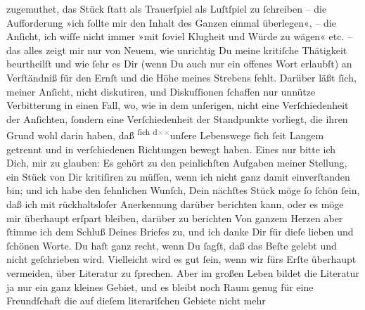 \begin{ledgroupsized}[t]{13cm}
               zugemuthet, das Stück ſtatt
               als Trauerſpiel als Luſtſpiel zu ſchreiben – die Aufforderung »ich ſollte  mir den Inhalt des Ganzen einmal überlegen«, – die
               Anſicht, ich wiſſe nicht immer »mit ſoviel Klugheit und Würde zu wägen« etc. – das
               alles zeigt mir nur von Neuem, wie unrichtig Du \strikeout{\textcolor{gray}{me}} meine kritiſche Thätigkeit beurtheilſt und \strikeout{\textcolor{gray}{mit}} wie ſehr es Dir (wenn Du auch nur ein offenes Wort erlaubſt) an Verſtändniß
               für den Ernſt und die Höhe meines Strebens fehlt. Darüber läßt ſich, meiner Anſicht,
               nicht diskutiren, und Diskuſſionen ſchaffen nur 
               unnütze Verbitterung in einen Fall, wo, wie in dem {\pb}unſerigen, nicht eine Verſchiedenheit der Anſichten, ſondern eine Verſchiedenheit
               der Standpunkte vorliegt, die ihren Grund wohl darin haben, daß \substVorne{}\textsuperscript{ſich d\textcolor{gray}{×}\-\textcolor{gray}{×}}{\allowbreak}\substDazwischen{}unſere\substHinten{} Lebenswege ſich ſeit Langem getrennt und in verſchiedenen Richtungen bewegt
               haben.\pend
           \pstart
           Eines nur bitte ich Dich, mir zu glauben: Es gehört zu den peinlichſten Aufgaben
               meiner Stellung, ein Stück von Dir \strikeout{\textcolor{gray}{×}\-\textcolor{gray}{×}} kritiſiren zu müſſen, wenn ich nicht ganz damit einverſtanden bin; und ich
               habe den ſehnlichen Wunſch, Dein nächſtes Stück möge ſo ſchön ſein, daß ich mit
               rückhaltsloſer Anerkennung darüber berichten kann, oder es möge mir überhaupt erſpart
               bleiben, darüber zu berichten{\dotsfive}\pend
           \pstart
           Von ganzem Herzen  aber ſtimme ich dem Schluß Deines Briefes zu, und ich danke Dir für dieſe
               lieben {\pb}und ſchönen Worte. Du haſt ganz recht, wenn
               Du ſagſt, daß das Beſte gelebt und nicht geſchrieben wird. Vielleicht wird es gut
               ſein, wenn wir fürs Erſte überhaupt vermeiden, über Literatur zu ſprechen. Aber im
               großen Leben bildet die Literatur ja nur ein ganz kleines Gebiet, und es bleibt noch
               Raum genug für eine Freundſchaft die auf dieſem literariſchen Gebiete nicht mehr

\end{ledgroupsized}
